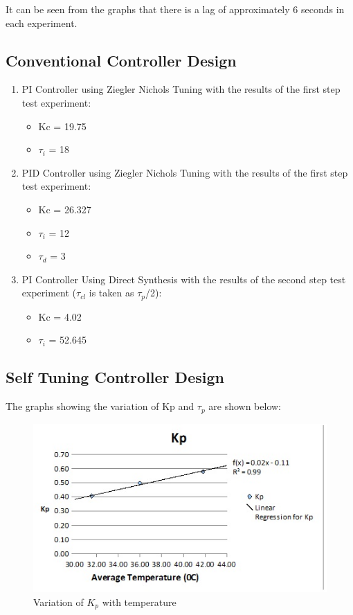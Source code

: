 It can be seen from the graphs that there is a lag of approximately 6 seconds in each experiment. 

\subsection{Conventional Controller Design}
\begin{enumerate}
	\item PI Controller using Ziegler Nichols Tuning with the results of the first step test experiment: 
\begin{itemize}
	\item Kc  = 19.75 
	\item $\tau_i$ = 18

\end{itemize}


	\item PID Controller using Ziegler Nichols Tuning with the results of the first step test experiment: 
\begin{itemize}
	\item Kc  = 26.327 
	\item $\tau_i$ = 12
	\item $\tau_d$ = 3

\end{itemize}


	\item PI Controller Using Direct Synthesis with the results of the second step test experiment ($\tau_{cl}$ is taken 
	as $\tau_p$/2):
\begin{itemize}
	\item Kc  = 4.02
	\item $\tau_i$ = 52.645

\end{itemize}


\end{enumerate}
\subsection{Self Tuning Controller Design}
\label{selftuningdesign}
The graphs showing the variation of Kp and $\tau_p$ are shown below:

\begin{figure}[h]
\centering
	\includegraphics[width = \textwidth]{Vikas_self/report_tex/parameter_estimation/kp.jpg}
		\caption{Variation of $K_p$ with temperature}
	\label{kp}
\end{figure}

